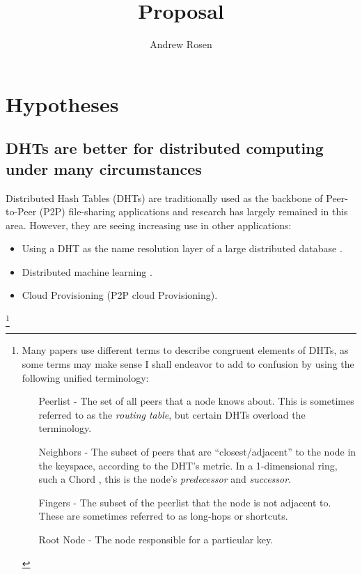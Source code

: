 \documentclass[10pt,letterpaper]{report}
\title{Proposal}
\author{Andrew Rosen}
\begin{document}
\maketitle
\setcounter{tocdepth}{4}
\tableofcontents
\newpage
\chapter{Hypotheses}

\section{DHTs are better for distributed computing under many circumstances}
Distributed Hash Tables (DHTs) are traditionally used as the backbone of Peer-to-Peer (P2P) file-sharing applications and research has largely remained in this area.
However, they are seeing increasing use in other applications:

\begin{itemize}
    \item Using a DHT as the name resolution layer of a large distributed database \cite{Mateescu2011440}. %
    \item Distributed machine learning \cite{liparameter}.
    \item Cloud Provisioning  (P2P cloud Provisioning).
\end{itemize}



\footnote{
Many papers use different terms to describe congruent elements of DHTs, as some terms may make sense 
I shall endeavor to add to confusion by using the following unified terminology:
\begin{enumerate}
    \item[Peerlist] -  The set of all peers that a node knows about.  This is sometimes referred to as the \textit{routing table}, but certain DHTs \cite{tapestry} \cite{pastry} overload the terminology.
    \item[Neighbors] - The subset of peers that are ``closest/adjacent'' to the node in the keyspace, according to the DHT's metric.  In a 1-dimensional ring, such a Chord \cite{chord}, this is the node's \textit{predecessor} and \textit{successor}.
    \item[Fingers] - The subset of the peerlist that  the node is not adjacent to.  These are sometimes referred to as long-hops or shortcuts. 
    \item[Root Node] - The node responsible for a particular key. 
\end{enumerate}
}
\end{document}
